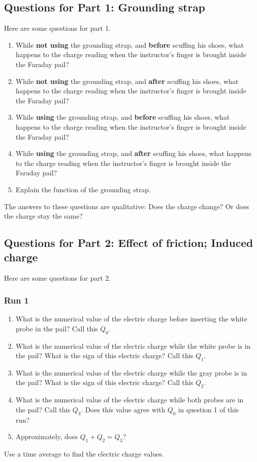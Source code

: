 \subsection{Questions for Part 1: Grounding strap}
%
Here are some questions for part 1.
\begin{enumerate}
	\item While \textbf{not using} the grounding strap, and \textbf{before} scuffing his shoes, what happens to the charge reading when the instructor's finger is brought inside the Faraday pail?
	\item While \textbf{not using} the grounding strap, and \textbf{after} scuffing his shoes, what happens to the charge reading when the instructor's finger is brought inside the Faraday pail?
	\item While \textbf{using} the grounding strap, and \textbf{before} scuffing his shoes, what happens to the charge reading when the instructor's finger is brought inside the Faraday pail?
	\item While \textbf{using} the grounding strap, and \textbf{after} scuffing his shoes, what happens to the charge reading when the instructor's finger is brought inside the Faraday pail?
	\item Explain the function of the grounding strap.
\end{enumerate}
The answers to these questions are qualitative: Does the charge change? Or does the charge stay the same?
%
\subsection{Questions for Part 2: Effect of friction; Induced charge}
%
Here are some questions for part 2.
%
\subsubsection{Run 1}
%
\begin{enumerate}
	\item What is the numerical value of the electric charge before inserting the white probe in the pail? Call this $Q_{0}$.
	\item What is the numerical value of the electric charge while the white probe is in the pail? What is the sign of this electric charge? Call this $Q_{1}$.
	\item What is the numerical value of the electric charge while the gray probe is in the pail? What is the sign of this electric charge? Call this $Q_{2}$.
	\item What is the numerical value of the electric charge while both probes are in the pail? Call this $Q_{3}$. Does this value agree with $Q_{0}$ in question 1 of this run?
	\item Approximately, does $Q_{1} + Q_{2} = Q_{3}$?
\end{enumerate}
Use a time average to find the electric charge values.
%
